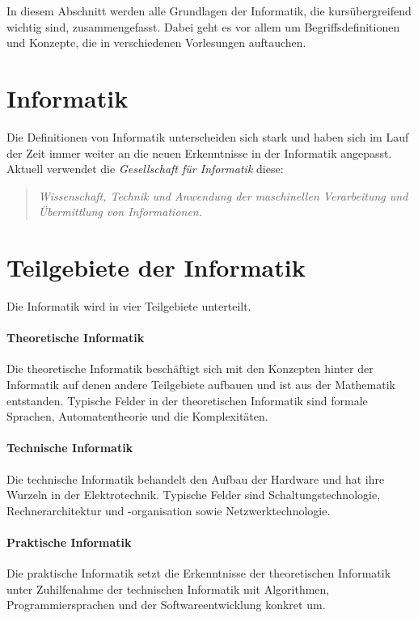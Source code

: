 \documentclass[../main.tex]{subfiles}
\begin{document}
    In diesem Abschnitt werden alle Grundlagen der Informatik, die kursübergreifend wichtig sind, zusammengefasst. Dabei geht es vor allem um Begriffsdefinitionen und Konzepte, die in verschiedenen Vorlesungen auftauchen.
    \clearpage

    \section{Informatik}
        Die Definitionen von Informatik unterscheiden sich stark und haben sich im Lauf der Zeit immer weiter an die neuen Erkenntnisse in der Informatik angepasst. Aktuell verwendet die \emph{Gesellschaft für Informatik} diese:
        
        \begin{quote}
            \emph{Wissenschaft, Technik und Anwendung der maschinellen Verarbeitung und Übermittlung von Informationen.}
        \end{quote}
        
    \section{Teilgebiete der Informatik}
        Die Informatik wird in vier Teilgebiete unterteilt.
        
        \paragraph{Theoretische Informatik}
            Die theoretische Informatik beschäftigt sich mit den Konzepten hinter der Informatik auf denen andere Teilgebiete aufbauen und ist aus der Mathematik entstanden. Typische Felder in der theoretischen Informatik sind formale Sprachen, Automatentheorie und die Komplexitäten.
            
        \paragraph{Technische Informatik}
            Die technische Informatik behandelt den Aufbau der Hardware und hat ihre Wurzeln in der Elektrotechnik. Typische Felder sind Schaltungstechnologie, Rechnerarchitektur und -organisation sowie Netzwerktechnologie.
            
        \paragraph{Praktische Informatik}
            Die praktische Informatik setzt die Erkenntnisse der theoretischen Informatik unter Zuhilfenahme der technischen Informatik mit Algorithmen, Programmiersprachen und der Softwareentwicklung konkret um.
            
\end{document}
